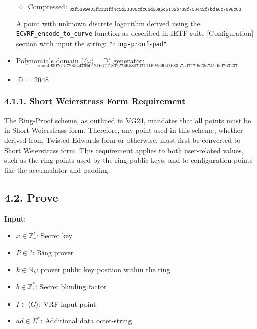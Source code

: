 \documentclass[
]{article}
\providecommand{\tightlist}{%
  \setlength{\itemsep}{0pt}\setlength{\parskip}{0pt}}
\begin{document}
\begin{itemize}
  \begin{itemize}
  \tightlist
  \item
    Compressed:
    \(_{\texttt{0xf5399e03f2121ff4c5d33386cdc66d56a6c5132b739f753442f7bda6c7698c03}}\)
  \end{itemize}

  A point with unknown discrete logarithm derived using the
  \texttt{ECVRF\_encode\_to\_curve} function as described in IETF suite
  {[}Configuration{]} section with input the string:
  \texttt{"ring-proof-pad"}.
\item
  Polynomials domain (\(\langle \omega \rangle = \mathbb{D}\))
  generator:
  \[_{\omega = 49307615728544765012166121802278658070711169839041683575071795236746050763237}\]
\item
  \(|\mathbb{D}| = 2048\)
\end{itemize}

\hypertarget{short-weierstrass-form-requirement}{%
\subsubsection{4.1.1. Short Weierstrass Form
Requirement}\label{short-weierstrass-form-requirement}}

The Ring-Proof scheme, as outlined in
\href{https://github.com/davxy/ring-proof-spec}{VG24}, mandates that all
points must be in Short Weierstrass form. Therefore, any point used in
this scheme, whether derived from Twisted Edwards form or otherwise,
must first be converted to Short Weierstrass form. This requirement
applies to both user-related values, such as the ring points used by the
ring public keys, and to configuration points like the accumulator and
padding.

\hypertarget{prove-2}{%
\subsection{4.2. Prove}\label{prove-2}}

\textbf{Input}:

\begin{itemize}
\tightlist
\item
  \(x \in \mathbb{Z}^*_r\): Secret key
\item
  \(P \in ?\): Ring prover
\item
  \(k \in \mathbb{N}_k\): prover public key position within the ring
\item
  \(b \in \mathbb{Z}^*_r\): Secret blinding factor
\item
  \(I \in \langle G \rangle\): VRF input point
\item
  \(ad \in \Sigma^*\): Additional data octet-string.
\end{itemize}
\end{document}
